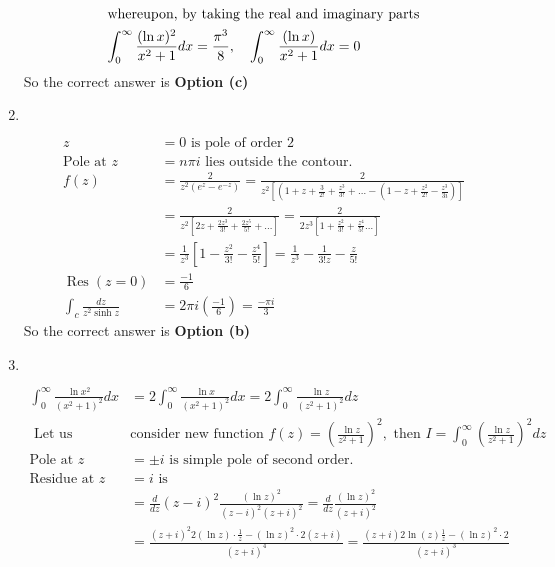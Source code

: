 \begin{enumerate}
\begin{answer}
\begin{align*}
	\intertext{whereupon, by taking the real and imaginary parts}
	\int_{0}^{\infty} \frac{(\ln x)^{2}}{x^{2}+1} d x&=\frac{\pi^{3}}{8}, \quad \int_{0}^{\infty} \frac{(\ln x)}{x^{2}+1} d x=0
	\end{align*}
	So the correct answer is \textbf{Option (c)}
\end{answer}
\item $\left. \right. $
\begin{answer}
	\begin{align*}
	z&=0\text{ is pole of order 2}\\
	\text{Pole at }z&=n \pi i\text{ lies outside the contour.}\\
	f(z)&=\frac{2}{z^{2}\left(e^{z}-e^{-z}\right)}=\frac{2}{z^{2}\left[\left(1+z+\frac{3}{2 !}+\frac{z^{3}}{3 !}+\ldots-\left(1-z+\frac{z^{2}}{2 !}-\frac{z^{3}}{3 i}\right)\right]\right.}\\
	&=\frac{2}{z^{2}\left[2 z+\frac{2 z^{3}}{3 !}+\frac{2 z^{5}}{5 !}+\ldots\right]}=\frac{2}{2 z^{3}\left[1+\frac{z^{2}}{3 !}+\frac{z^{4}}{5 !} \ldots\right]}\\
	&=\frac{1}{z^{3}}\left[1-\frac{z^{2}}{3 !}-\frac{z^{4}}{5 !}\right]=\frac{1}{z^{3}}-\frac{1}{3 ! z}-\frac{z}{5 !}\\
	\operatorname{Res}(z=0)&=\frac{-1}{6}\\
	\int_{c} \frac{d z}{z^{2} \sinh z}&=2 \pi i\left(\frac{-1}{6}\right)=\frac{-\pi i}{3}
	\end{align*}
	So the correct answer is \textbf{Option (b)}
\end{answer}
\item $\left. \right. $
\begin{answer}
	\begin{align*}
	\int_{0}^{\infty} \frac{\ln x^{2}}{\left(x^{2}+1\right)^{2}} d x&=2 \int_{0}^{\infty} \frac{\ln x}{\left(x^{2}+1\right)^{2}} d x=2 \int_{0}^{\infty} \frac{\ln z}{\left(z^{2}+1\right)^{2}} d z\\
	\text{	Let us }&\text{consider new function }f(z)=\left(\frac{\ln z}{z^{2}+1}\right)^{2},\text{ then }I=\int_{0}^{\infty}\left(\frac{\ln z}{z^{2}+1}\right)^{2} d z\\
	\text{Pole at }z&=\pm i\text{ is simple pole of second order.}\\
	\text{Residue at }z&=i\text{ is}\\
	&=\frac{d}{d z}(z-i)^{2} \frac{(\ln z)^{2}}{(z-i)^{2}(z+i)^{2}}=\frac{d}{d z} \frac{(\ln z)^{2}}{(z+i)^{2}}\\
	&=\frac{(z+i)^{2} 2(\ln z) \cdot \frac{1}{z}-(\ln z)^{2} \cdot 2(z+i)}{(z+i)^{4}}=\frac{(z+i) 2 \ln (z) \frac{1}{z}-(\ln z)^{2} \cdot 2}{(z+i)^{3}}\\

\end{align*}
\end{answer}
\end{enumerate}
